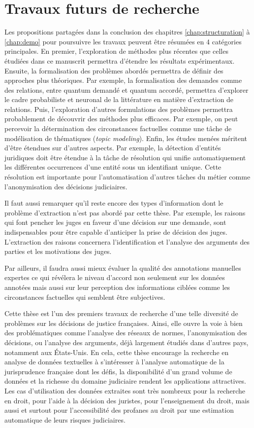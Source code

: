 \section{Travaux futurs de recherche}
\label{sec:conclusion:extensions}
Les propositions partagées dans la conclusion des chapitres \ref{chap:structuration} à \ref{chap:demo} pour poursuivre les travaux peuvent être résumées en 4 catégories principales. En premier, l'exploration de méthodes plus récentes que celles étudiées dans ce manuscrit permettra d'étendre les résultats expérimentaux. Ensuite, la formalisation des problèmes abordés permettra de définir des approches plus théoriques. Par exemple, la formalisation des demandes comme des relations, entre quantum demandé et quantum accordé, permettra d'explorer le cadre probabiliste et neuronal de la littérature en matière d'extraction de relations. Puis, l'exploration d'autres formulations des problèmes permettra probablement de découvrir des méthodes plus efficaces. Par exemple, on peut percevoir la détermination des circonstances factuelles comme une tâche de modélisation de thématiques (\textit{topic modeling}). Enfin, les études menées méritent d'être étendues sur d'autres aspects. Par exemple, la détection d'entités juridiques doit être étendue à la tâche de résolution qui unifie automatiquement les différentes occurrences d'une entité sous un identifiant unique. Cette résolution est importante pour l'automatisation d'autres tâches du métier comme l'anonymisation des décisions judiciaires.

Il faut aussi remarquer qu'il reste encore des types d'information dont le problème d'extraction n'est pas abordé par cette thèse. Par exemple, les raisons qui  font pencher les juges en faveur d'une décision sur une demande, sont indispensables pour être capable d'anticiper la prise de décision des juges. L'extraction des raisons concernera l'identification et l'analyse des arguments des parties et les motivations des juges.

 Par ailleurs, il faudra aussi mieux évaluer la qualité des annotations manuelles expertes ce qui révélera le niveau d'accord non seulement sur les données annotées mais aussi sur leur perception des informations ciblées comme les circonstances factuelles qui semblent être subjectives. 

Cette thèse est l'un des premiers travaux de recherche d'une telle diversité de problèmes sur les décisions de justice françaises. Ainsi, elle ouvre la voie à bien des problématiques comme l'analyse des réseaux de normes, l'anonymisation des décisions, ou l'analyse des arguments, déjà largement étudiés dans d'autres pays, notamment aux États-Unis. En cela, cette thèse encourage la recherche en analyse de données textuelles à s'intéresser à l'analyse automatique de la jurisprudence française dont les défis, la disponibilité d'un grand volume de données et la richesse du domaine judiciaire rendent les applications attractives. Les cas d'utilisation des données extraites sont très nombreux pour la recherche en droit, pour l'aide à la décision des juristes, pour l'enseignement du droit, mais aussi et surtout pour l'accessibilité des profanes au droit par une estimation automatique de leurs risques judiciaires.
